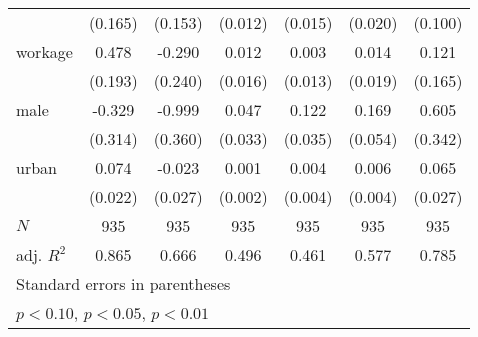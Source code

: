 {\begin{tabular}{l*{6}{c}}
            &     (0.165)         &     (0.153)         &     (0.012)         &     (0.015)         &     (0.020)         &     (0.100)         \\
[1em]
workage     &       0.478\sym{**} &      -0.290         &       0.012         &       0.003         &       0.014         &       0.121         \\
            &     (0.193)         &     (0.240)         &     (0.016)         &     (0.013)         &     (0.019)         &     (0.165)         \\
[1em]
male        &      -0.329         &      -0.999\sym{**} &       0.047         &       0.122\sym{***}&       0.169\sym{***}&       0.605\sym{*}  \\
            &     (0.314)         &     (0.360)         &     (0.033)         &     (0.035)         &     (0.054)         &     (0.342)         \\
[1em]
urban       &       0.074\sym{***}&      -0.023         &       0.001         &       0.004         &       0.006         &       0.065\sym{**} \\
            &     (0.022)         &     (0.027)         &     (0.002)         &     (0.004)         &     (0.004)         &     (0.027)         \\
\hline
\(N\)       &         935         &         935         &         935         &         935         &         935         &         935         \\
adj. \(R^{2}\)&       0.865         &       0.666         &       0.496         &       0.461         &       0.577         &       0.785         \\
\hline\hline
\multicolumn{7}{l}{\footnotesize Standard errors in parentheses}\\
\multicolumn{7}{l}{\footnotesize \sym{*} \(p<0.10\), \sym{**} \(p<0.05\), \sym{***} \(p<0.01\)}\\
\end{tabular}
}
